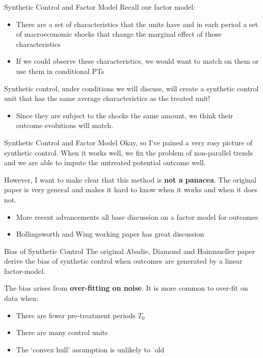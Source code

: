 \documentclass[aspectratio=169,t,11pt,table]{beamer}
\begin{document}
\begin{frame}{Synthetic Control and Factor Model}
  Recall our factor model:
  \begin{itemize}
    \item There are a set of characteristics that the units have and in each period a set of macroeconomic shocks that change the marginal effect of those characteristics
    \item If we could observe these characteristics, we would want to match on them or use them in conditional PTs
  \end{itemize}

  \pause
  \bigskip
  Synthetic control, under conditions we will discuss, will create a synthetic control unit that has the same average characteristics as the treated unit! 
  \begin{itemize}
    \item Since they are subject to the shocks the same amount, we think their outcome evolutions will match.
  \end{itemize}
\end{frame}

\begin{frame}{Synthetic Control and Factor Model}
  Okay, so I've pained a very rosy picture of synthetic control. When it works well, we fix the problem of non-parallel trends and we are able to impute the untreated potential outcome well. 
  
  \bigskip
  However, I want to make clear that this method is \textbf{not a panacea}. The original paper is very general and makes it hard to know when it works and when it does not. 
  \begin{itemize}
    \item More recent advancements all base discussion on a factor model for outcomes
    \item Hollingsworth and Wing working paper has great discussion
  \end{itemize} 
\end{frame}

\begin{frame}{Bias of Synthetic Control}
  The original Abadie, Diamond and Hainmueller paper derive the bias of synthetic control when outcomes are generated by a linear factor-model. 
  
  \bigskip
  The bias arises from \textbf{over-fitting on noise}. It is more common to over-fit on data when: 
  \begin{itemize}
    \item There are fewer pre-treatment periods $T_0$
    
    \item There are many control units
    
    \item The `convex hull' assumption is unlikely to ˙old
  \end{itemize}
\end{frame}
\end{document}
